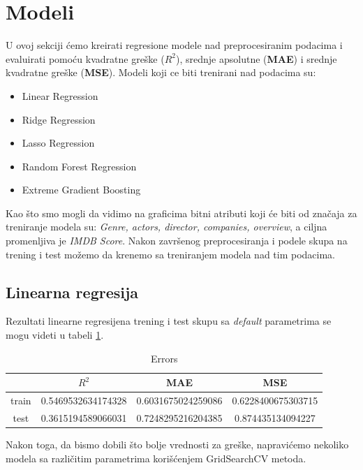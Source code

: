 \documentclass[a4paper]{article}
\begin{document}
\section{Modeli}
\label{sec:modeli}
U ovoj sekciji ćemo kreirati regresione modele nad preprocesiranim podacima i evaluirati pomoću kvadratne greške (\textbf{${R}^2$}), srednje apsolutne (\textbf{MAE}) i srednje kvadratne greške (\textbf{MSE}).
Modeli koji ce biti trenirani nad podacima su:
\begin{itemize}
	\item Linear Regression
	\item Ridge Regression
	\item Lasso Regression
	\item Random Forest Regression
	\item Extreme Gradient Boosting
\end{itemize}

Kao što smo mogli da vidimo na graficima bitni atributi koji će biti od značaja za treniranje modela su: \textit{Genre, actors, director, companies, overview}, a ciljna promenljiva je \textit{IMDB Score}. Nakon završenog preprocesiranja i podele skupa na trening i test možemo da krenemo sa treniranjem modela nad tim podacima.

\subsection{Linearna regresija}
\label{sec:linearna_1}
Rezultati linearne regresijena trening i test skupu sa \textit{default} parametrima se mogu videti u tabeli \ref{table:table_1}.

\begin{table}[h!]
\caption{Errors}
\centering %
\begin{tabular}{c c c c} %
\hline\hline %
 & ${R}^2$ & MAE & MSE \\ [0.2ex] %
\hline %
train & 0.5469532634174328 & 0.6031675024259086 & 0.6228400675303715 \\ %
test & 0.3615194589066031 & 0.7248295216204385 & 0.874435134094227 \\ [1ex] %
\end{tabular}
\label{table:table_1}
\end{table}

Nakon toga, da bismo dobili što bolje vrednosti za greške, napravićemo nekoliko modela sa različitim parametrima korišćenjem GridSearchCV metoda\cite{gridSearchCV}.
\end{document}
